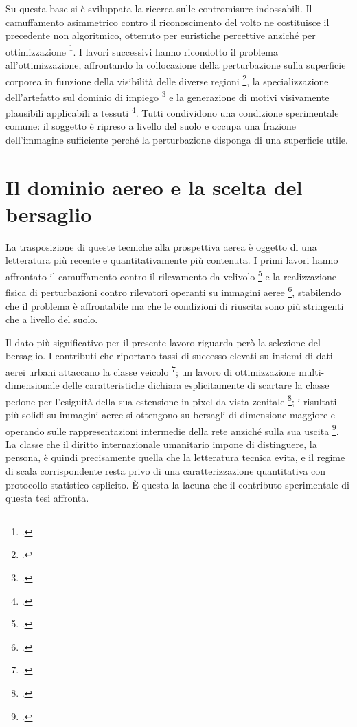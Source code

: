 \documentclass[a4paper,12pt]{report}
\begin{document}
Su questa base si è sviluppata la ricerca sulle contromisure indossabili. Il
camuffamento asimmetrico contro il riconoscimento del volto ne costituisce il
precedente non algoritmico, ottenuto per euristiche percettive anziché per
ottimizzazione \footcite{harvey_2010}. I lavori successivi hanno ricondotto il
problema all'ottimizzazione, affrontando la collocazione della perturbazione
sulla superficie corporea in funzione della visibilità delle diverse regioni
\footcite{huang_2020_upc}, la specializzazione dell'artefatto sul dominio di
impiego \footcite{wu_2020} e la generazione di motivi visivamente plausibili
applicabili a tessuti \footcite{hu_2022}. Tutti condividono una condizione
sperimentale comune: il soggetto è ripreso a livello del suolo e occupa una
frazione dell'immagine sufficiente perché la perturbazione disponga di una
superficie utile.

\section{Il dominio aereo e la scelta del bersaglio}
\label{sec:sota_aereo}

La trasposizione di queste tecniche alla prospettiva aerea è oggetto di una
letteratura più recente e quantitativamente più contenuta. I primi lavori hanno
affrontato il camuffamento contro il rilevamento da velivolo
\footcite{adhikari_2020} e la realizzazione fisica di perturbazioni contro
rilevatori operanti su immagini aeree \footcite{du_2022}, stabilendo che il
problema è affrontabile ma che le condizioni di riuscita sono più stringenti che
a livello del suolo.

Il dato più significativo per il presente lavoro riguarda però la selezione del
bersaglio. I contributi che riportano tassi di successo elevati su insiemi di
dati aerei urbani attaccano la classe veicolo \footcite{shrestha_2023}; un lavoro
di ottimizzazione multi-dimensionale delle caratteristiche dichiara
esplicitamente di scartare la classe pedone per l'esiguità della sua estensione
in pixel da vista zenitale \footcite{xi_2025_lfrap}; i risultati più solidi su
immagini aeree si ottengono su bersagli di dimensione maggiore e operando sulle
rappresentazioni intermedie della rete anziché sulla sua uscita
\footcite{tang_2023}. La classe che il diritto internazionale umanitario impone
di distinguere, la persona, è quindi precisamente quella che la letteratura
tecnica evita, e il regime di scala corrispondente resta privo di una
caratterizzazione quantitativa con protocollo statistico esplicito. È questa la
lacuna che il contributo sperimentale di questa tesi affronta.
\end{document}
